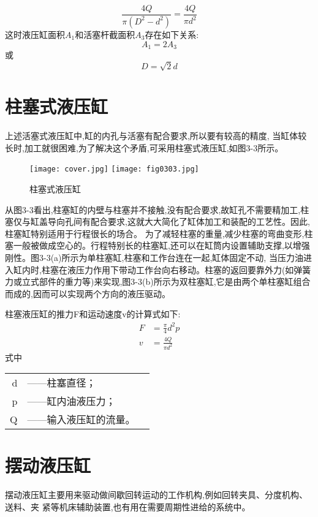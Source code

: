 \begin{equation*}
\frac{4Q}{\pi(D^2-d^2)}=\frac{4Q}{\pi d^2}
\end{equation*}
\indent
这时液压缸面积$A_1$和活塞杆截面积$A_3$存在如下关系:
\begin{equation*}
    A_1=2A_3
\end{equation*}
或
\begin{equation}
    D=\sqrt{2}d    
\end{equation}
\section{柱塞式液压缸}
上述活塞式液压缸中,缸的内孔与活塞有配合要求,所以要有较高的精度,
当缸体较长时,加工就很困难,为了解决这个矛盾,可采用柱塞式液压缸,如图3-3所示。
\begin{figure} [htbp]
    \centering
    \ifOpenSource
    \texttt{[image: cover.jpg]}
    \else
    \texttt{[image: fig0303.jpg]}
    \fi
    \caption{柱塞式液压缸} %
    \label{fig:fig0303}%
\end{figure}

从图3-3看出,柱塞缸的内壁与柱塞并不接触,没有配合要求,故缸孔不需要精加工,柱塞仅与缸盖导向孔间有配合要求,这就大大简化了缸体加工和装配的工艺性。因此,柱塞缸特别适用于行程很长的场合。
为了减轻柱塞的重量,减少柱塞的弯曲变形,柱塞一般被做成空心的。行程特别长的柱塞缸,还可以在缸筒内设置辅助支撑,以增强刚性。图3-3(a)所示为单柱塞缸,柱塞和工作台连在一起,缸体固定不动,
当压力油进入缸内时,柱塞在液压力作用下带动工作台向右移动。柱塞的返回要靠外力(如弹簧力或立式部件的重力等)来实现,图3-3(b)所示为双柱塞缸,它是由两个单柱塞缸组合而成的,因而可以实现两个方向的液压驱动。

柱塞液压缸的推力F和运动速度v的计算式如下:
\begin{align}
    F&=\frac{\pi}{4}d^2p\\
    v&=\frac{4Q}{\pi d^2}
\end{align}
式中
\begin{tabular}[t]{rll}
    d&——柱塞直径；\\
    p&——缸内油液压力；\\
    Q&——输入液压缸的流量。\\
\end{tabular}

\section{摆动液压缸}
摆动液压缸主要用来驱动做间歇回转运动的工作机构,例如回转夹具、分度机构、送料、夹
\newpage
\noindent
紧等机床辅助装置,也有用在需要周期性进给的系统中。

